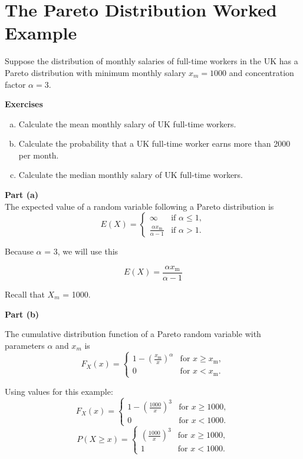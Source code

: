 \documentclass[a4paper,12pt]{article}
\begin{document}
\large 

\section*{The Pareto Distribution Worked Example}

Suppose the distribution of monthly salaries of full-time workers in the UK has
a Pareto distribution with minimum monthly salary $x_m = 1000$ and concentration
factor $\alpha = 3$. \\
\medskip

\noindent \textbf{Exercises}
\begin{enumerate}[(a)]
\item Calculate the mean monthly salary of UK full-time workers.
\item Calculate the probability that a UK full-time worker earns more than 2000 per month.
\item Calculate the median monthly salary of UK full-time workers.
\end{enumerate}

\medskip
\noindent \textbf{Part (a)}\\
\noindent The expected value of a random variable following a Pareto distribution is
\[E(X)= \begin{cases} \infty & \mbox{if }\alpha\le 1, \\ \frac{\alpha x_\mathrm{m}}{\alpha-1} & \mbox{if }\alpha>1. \end{cases}
\]

\medskip
Because \textbf{$\alpha$} = $3$, we will use this
{

\[
E(X)= \frac{\alpha x_\mathrm{m}}{\alpha-1}   
\]
}
Recall that $X_m$ = 1000.

\newpage 
\noindent \textbf{Part (b)}\\
\begin{framed}
\noindent The cumulative distribution function of a Pareto random variable with parameters $\alpha$ and $x_m$ is
\[
F_X(x) = \begin{cases}
1-\left(\frac{x_\mathrm{m}}{x}\right)^\alpha & \mbox{for } x \ge x_\mathrm{m}, \\
0 & \mbox{for }x < x_\mathrm{m}.
\end{cases}
\]
\end{framed}

\noindent Using values for this example:
\[
F_X(x) = \begin{cases}
1-\left(\frac{1000}{x}\right)^3 & \mbox{for } x \ge 1000, \\
0 & \mbox{for }x < 1000.
\end{cases}
\]
\[
P(X \geq x) = \begin{cases}
\left(\frac{1000}{x}\right)^3 & \mbox{for } x \ge 1000, \\
1 & \mbox{for }x < 1000.
\end{cases}
\]
\end{document}
